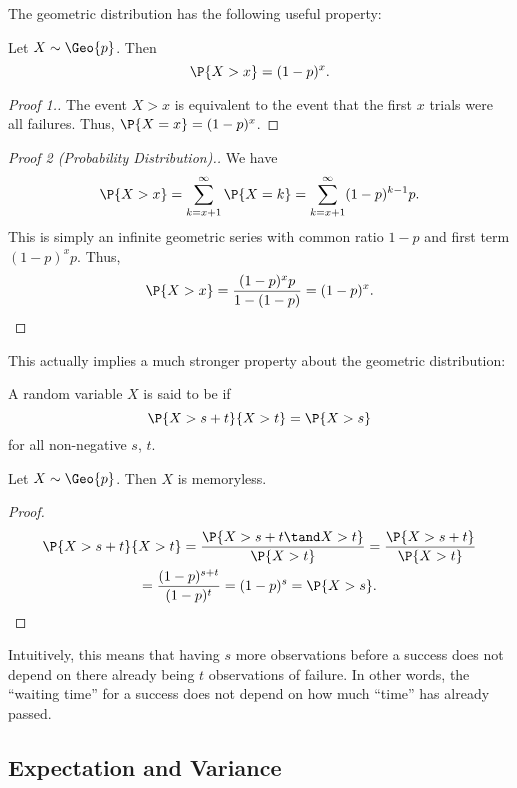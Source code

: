 The geometric distribution has the following useful property:
\begin{proposition}
    Let $X \sim \Geo{p}$. Then \[\P{X > x} = (1-p)^x.\]
\end{proposition}
\begin{proof}[Proof 1.]
    The event $X > x$ is equivalent to the event that the first $x$ trials were all failures. Thus, $\P{X = x} = (1-p)^x$.
\end{proof}
\begin{proof}[Proof 2 (Probability Distribution).]
    We have \[\P{X > x} = \sum_{k = x + 1}^\infty \P{X = k} = \sum_{k = x+1}^\infty (1-p)^{k-1} p.\] This is simply an infinite geometric series with common ratio $1-p$ and first term $(1-p)^x p$. Thus, \[\P{X > x} = \frac{(1-p)^x p}{1 - (1-p)} = (1-p)^x.\]
\end{proof}

This actually implies a much stronger property about the geometric distribution:

\begin{definition}
    A random variable $X$ is said to be  if \[\P{X > s + t}{X > t} = \P{X > s}\] for all non-negative $s$, $t$.
\end{definition}

\begin{proposition}
    Let $X \sim \Geo{p}$. Then $X$ is memoryless.
\end{proposition}
\begin{proof}
    \begin{gather*}
        \P{X > s + t}{X > t} = \frac{\P{X > s + t \tand X > t}}{\P{X > t}} = \frac{\P{X > s + t}}{\P{X > t}}\\
        = \frac{(1-p)^{s+t}}{(1-p)^t} = (1-p)^s = \P{X > s}.
    \end{gather*}
\end{proof}

Intuitively, this means that having $s$ more observations before a success does not depend on there already being $t$ observations of failure. In other words, the ``waiting time'' for a success does not depend on how much ``time'' has already passed.

\subsection{Expectation and Variance}

